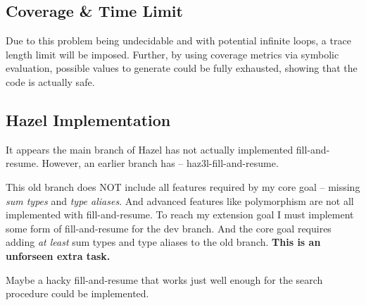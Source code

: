 \subsection{Coverage \& Time Limit}
Due to this problem being undecidable and with potential infinite loops, a trace length limit will be imposed. Further, by using coverage metrics via symbolic evaluation, possible values to generate could be fully exhausted, showing that the code is actually safe.

\subsection{Hazel Implementation}
It appears the main branch of Hazel has not actually implemented fill-and-resume. However, an earlier branch has -- haz3l-fill-and-resume.\par 
This old branch does NOT include all features required by my core goal -- missing \textit{sum types} and \textit{type aliases}. And advanced features like polymorphism are not all implemented with fill-and-resume. To reach my extension goal I must implement some form of fill-and-resume for the dev branch. And the core goal requires adding \textit{at least} sum types and type aliases to the old branch. \textbf{This is an unforseen extra task.}\par 
Maybe a hacky fill-and-resume that works just well enough for the search procedure could be implemented.